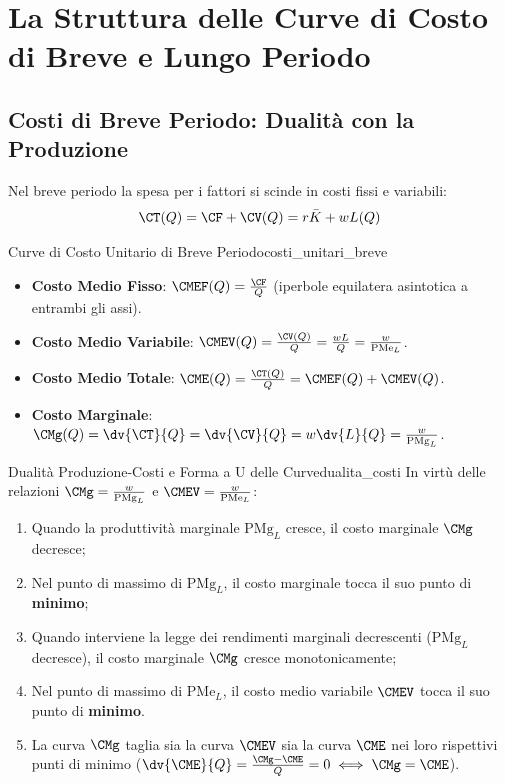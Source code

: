 \section{La Struttura delle Curve di Costo di Breve e Lungo Periodo}

\subsection{Costi di Breve Periodo: Dualità con la Produzione}
Nel breve periodo la spesa per i fattori si scinde in costi fissi e variabili:
\begin{equation}
    \CT(Q) = \CF + \CV(Q) = r\bar{K} + wL(Q)
\end{equation}
\begin{definizione}{Curve di Costo Unitario di Breve Periodo}{costi_unitari_breve}
\begin{itemize}
    \item \textbf{Costo Medio Fisso}: $\CMEF(Q) = \frac{\CF}{Q}$ (iperbole equilatera asintotica a entrambi gli assi).
    \item \textbf{Costo Medio Variabile}: $\CMEV(Q) = \frac{\CV(Q)}{Q} = \frac{wL}{Q} = \frac{w}{\mathrm{PMe}_L}$.
    \item \textbf{Costo Medio Totale}: $\CME(Q) = \frac{\CT(Q)}{Q} = \CMEF(Q) + \CMEV(Q)$.
    \item \textbf{Costo Marginale}: $\CMg(Q) = \dv{\CT}{Q} = \dv{\CV}{Q} = w \dv{L}{Q} = \frac{w}{\mathrm{PMg}_L}$.
\end{itemize}
\end{definizione}

\begin{teorema}{Dualità Produzione-Costi e Forma a U delle Curve}{dualita_costi}
In virtù delle relazioni $\CMg = \frac{w}{\mathrm{PMg}_L}$ e $\CMEV = \frac{w}{\mathrm{PMe}_L}$:
\begin{enumerate}
    \item Quando la produttività marginale $\mathrm{PMg}_L$ cresce, il costo marginale $\CMg$ decresce;
    \item Nel punto di massimo di $\mathrm{PMg}_L$, il costo marginale tocca il suo punto di \textbf{minimo};
    \item Quando interviene la legge dei rendimenti marginali decrescenti ($\mathrm{PMg}_L$ decresce), il costo marginale $\CMg$ cresce monotonicamente;
    \item Nel punto di massimo di $\mathrm{PMe}_L$, il costo medio variabile $\CMEV$ tocca il suo punto di \textbf{minimo}.
    \item La curva $\CMg$ taglia sia la curva $\CMEV$ sia la curva $\CME$ nei loro rispettivi punti di minimo ($\dv{\CME}{Q} = \frac{\CMg - \CME}{Q} = 0 \iff \CMg = \CME$).
\end{enumerate}
\end{teorema}

